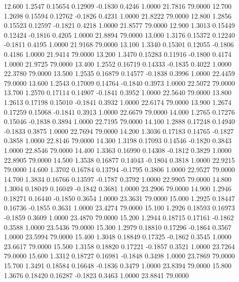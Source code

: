  12.600   1.2547   0.15654   0.12909  -0.1830   0.4246   1.0000  21.7816  79.0000
  12.700   1.2698   0.15594   0.12762  -0.1826   0.4231   1.0000  21.8222  79.0000
  12.800   1.2856   0.15523   0.12597  -0.1821   0.4218   1.0000  21.8577  79.0000
  12.900   1.3013   0.15449   0.12424  -0.1816   0.4205   1.0000  21.8894  79.0000
  13.000   1.3176   0.15372   0.12240  -0.1811   0.4195   1.0000  21.9168  79.0000
  13.100   1.3340   0.15301   0.12055  -0.1806   0.4186   1.0000  21.9414  79.0000
  13.200   1.3470   0.15283   0.11916  -0.1800   0.4174   1.0000  21.9725  79.0000
  13.400   1.2552   0.16719   0.14333  -0.1835   0.4022   1.0000  22.3780  79.0000
  13.500   1.2535   0.16879   0.14577  -0.1838   0.3996   1.0000  22.4459  79.0000
  13.600   1.2543   0.17009   0.14764  -0.1840   0.3973   1.0000  22.5072  79.0000
  13.700   1.2570   0.17114   0.14907  -0.1841   0.3952   1.0000  22.5640  79.0000
  13.800   1.2613   0.17198   0.15010  -0.1841   0.3932   1.0000  22.6174  79.0000
  13.900   1.2674   0.17259   0.15068  -0.1841   0.3913   1.0000  22.6679  79.0000
  14.000   1.2765   0.17276   0.15046  -0.1838   0.3894   1.0000  22.7195  79.0000
  14.100   1.2888   0.17248   0.14940  -0.1833   0.3875   1.0000  22.7694  79.0000
  14.200   1.3036   0.17183   0.14765  -0.1827   0.3858   1.0000  22.8146  79.0000
  14.300   1.3198   0.17093   0.14546  -0.1820   0.3843   1.0000  22.8546  79.0000
  14.400   1.3363   0.16990   0.14308  -0.1812   0.3829   1.0000  22.8905  79.0000
  14.500   1.3538   0.16877   0.14043  -0.1804   0.3818   1.0000  22.9215  79.0000
  14.600   1.3702   0.16784   0.13794  -0.1795   0.3806   1.0000  22.9527  79.0000
  14.700   1.3834   0.16766   0.13597  -0.1787   0.3792   1.0000  22.9905  79.0000
  14.800   1.3004   0.18049   0.16049  -0.1842   0.3681   1.0000  23.2906  79.0000
  14.900   1.2946   0.18271   0.16440  -0.1850   0.3654   1.0000  23.3631  79.0000
  15.000   1.2925   0.18447   0.16736  -0.1855   0.3631   1.0000  23.4274  79.0000
  15.100   1.2926   0.18593   0.16973  -0.1859   0.3609   1.0000  23.4870  79.0000
  15.200   1.2944   0.18715   0.17161  -0.1862   0.3588   1.0000  23.5436  79.0000
  15.300   1.2979   0.18810   0.17296  -0.1864   0.3567   1.0000  23.5994  79.0000
  15.400   1.3048   0.18849   0.17325  -0.1862   0.3545   1.0000  23.6617  79.0000
  15.500   1.3158   0.18820   0.17221  -0.1857   0.3521   1.0000  23.7264  79.0000
  15.600   1.3312   0.18727   0.16981  -0.1848   0.3498   1.0000  23.7869  79.0000
  15.700   1.3491   0.18584   0.16648  -0.1836   0.3479   1.0000  23.8394  79.0000
  15.800   1.3676   0.18420   0.16287  -0.1823   0.3463   1.0000  23.8841  79.0000
